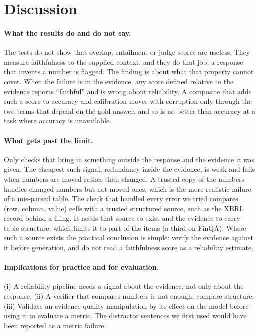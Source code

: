 \section{Discussion}

\paragraph{What the results do and do not say.}
The tests do not show that overlap, entailment or judge scores are useless.
They measure faithfulness to the supplied context, and they do that job: a response that invents a number is flagged.
The finding is about what that property cannot cover.
When the failure is in the evidence, any score defined relative to the evidence reports ``faithful'' and is wrong about reliability.
A composite that adds such a score to accuracy and calibration moves with corruption only through the two terms that depend on the gold answer, and so is no better than accuracy at a task where accuracy is unavailable.

\paragraph{What gets past the limit.}
Only checks that bring in something outside the response and the evidence it was given.
The cheapest such signal, redundancy inside the evidence, is weak and fails when numbers are moved rather than changed.
A trusted copy of the numbers handles changed numbers but not moved ones, which is the more realistic failure of a mis-parsed table.
The check that handled every error we tried compares (row, column, value) cells with a trusted structured source, such as the XBRL record behind a filing. It needs that source to exist and the evidence to carry table structure, which limits it to part of the items (a third on FinQA).
Where such a source exists the practical conclusion is simple: verify the evidence against it before generation, and do not read a faithfulness score as a reliability estimate.

\paragraph{Implications for practice and for evaluation.}
(i) A reliability pipeline needs a signal about the evidence, not only about the response.
(ii) A verifier that compares numbers is not enough; compare structure.
(iii) Validate an evidence-quality manipulation by its effect on the model before using it to evaluate a metric. The distractor sentences we first used would have been reported as a metric failure.

